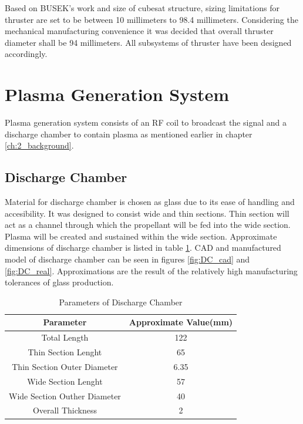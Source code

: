 Based on BUSEK's work and size of cubesat structure, sizing limitations for thruster are set to be between 10 millimeters to 98.4 millimeters. Considering the mechanical manufacturing convenience it was decided that overall thruster diameter shall be 94 millimeters. All subsystems of thruster have been designed accordingly. 

\section{Plasma Generation System}
Plasma generation system consists of an RF coil to broadcast the signal and a discharge chamber to contain plasma as mentioned earlier in chapter \ref{ch:2_background}. 
\subsection{Discharge Chamber}
Material for discharge chamber is chosen as glass due to its ease of handling and accesibility. It was designed to consist wide and thin sections. Thin section will act as a channel through which the propellant will be fed into the wide section. Plasma will be created and sustained within the wide section. Approximate dimensions of discharge chamber is listed in table \ref{table:DC_params}. CAD and manufactured model of discharge chamber can be seen in figures \ref{fig:DC_cad} and \ref{fig:DC_real}. Approximations are the result of the relatively high manufacturing tolerances of glass production. 

\begin{table}[ht]
    \centering
    \begin{tabular}{||c|c||}
        \hline
        \textbf{Parameter} & \textbf{Approximate Value(mm)} \\
        \hline
        Total Length & 122 \\
        \hline
        Thin Section Lenght & 65 \\
        \hline
        Thin Section Outer Diameter & 6.35 \\
        \hline
        Wide Section Lenght & 57 \\
        \hline
        Wide Section Outher Diameter & 40 \\
        \hline
        Overall Thickness & 2 \\
        \hline
    \end{tabular}
    \caption{Parameters of Discharge Chamber}
    \label{table:DC_params}
\end{table}
 
